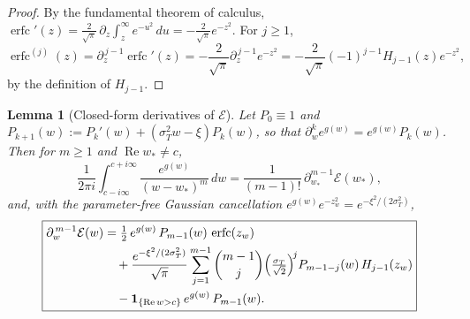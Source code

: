 \documentclass[11pt]{article}
\newtheorem{lemma}[theorem]{Lemma}
\DeclareMathOperator{\Real}{Re}
\DeclareMathOperator{\erfc}{erfc}
\begin{document}
\begin{proof}
By the fundamental theorem of calculus,
$\erfc'(z)=\tfrac{2}{\sqrt\pi}\,\partial_z\!\int_z^\infty e^{-u^2}\,du
=-\tfrac{2}{\sqrt\pi}e^{-z^2}$. For $j\ge1$,
\begin{equation}\label{eq:hermite-pf}
\erfc^{(j)}(z)=\partial_z^{\,j-1}\erfc'(z)
=-\frac{2}{\sqrt\pi}\partial_z^{\,j-1}e^{-z^2}
=-\frac{2}{\sqrt\pi}(-1)^{j-1}H_{j-1}(z)e^{-z^2},
\end{equation}
by the definition of $H_{j-1}$.
\end{proof}

\begin{lemma}[Closed-form derivatives of $\mathcal E$]\label{lem:dE}
Let $P_0\equiv1$ and $P_{k+1}(w):=P_k'(w)+(\sigma_T^2w-\xi)P_k(w)$, so that
$\partial_w^{k}e^{g(w)}=e^{g(w)}P_k(w)$. Then for $m\ge1$ and
$\Real w_*\neq c$,
\begin{equation}\label{eq:dE-int}
\frac{1}{2\pi i}\int_{c-i\infty}^{c+i\infty}\frac{e^{g(w)}}{(w-w_*)^{m}}\,dw
=\frac{1}{(m-1)!}\,\partial_{w_*}^{m-1}\mathcal E(w_*),
\end{equation}
and, with the parameter-free Gaussian cancellation
$e^{g(w)}e^{-z_w^2}=e^{-\xi^2/(2\sigma_T^2)}$,
\begin{equation}\label{eq:dE-explicit}
\boxed{
\begin{aligned}
\partial_w^{\,m-1}\mathcal E(w)
&=\tfrac12\,e^{g(w)}\,P_{m-1}(w)\,\erfc(z_w)\\
&\quad+\frac{e^{-\xi^2/(2\sigma_T^2)}}{\sqrt\pi}
\sum_{j=1}^{m-1}\binom{m-1}{j}\Bigl(\tfrac{\sigma_T}{\sqrt2}\Bigr)^{\!j}
P_{m-1-j}(w)\,H_{j-1}(z_w)\\
&\quad-\mathbf1_{\{\Real w>c\}}\,e^{g(w)}\,P_{m-1}(w).
\end{aligned}}
\end{equation}
\end{lemma}
\end{document}
